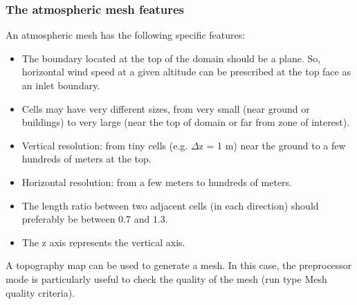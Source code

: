 {{\subsubsection{The atmospheric mesh features}
%
An atmospheric mesh has the following specific features:
%
\begin{itemize}
\item The boundary located at the top of the domain should be a plane.
So, horizontal wind speed at a given altitude can be prescribed at the top
face as an inlet boundary.
\item Cells may have very different sizes, from very small (near ground or
buildings) to very large (near the top of domain or far from zone of interest).
\item Vertical resolution: from tiny cells (e.g. $\Delta $\upshape z = 1 m) near
the ground to a few hundreds of meters at the top.
\item Horizontal resolution: from a few meters to hundreds of meters.
\item The length ratio between two adjacent cells (in each direction) should
preferably be between $0.7$ and $1.3$.
\item The z axis represents the vertical axis.
\end{itemize}
%
A topography map can be used to generate a mesh. In this case, the preprocessor
 mode is particularly useful to check the quality of the mesh (run type Mesh
quality criteria).
%
}}
